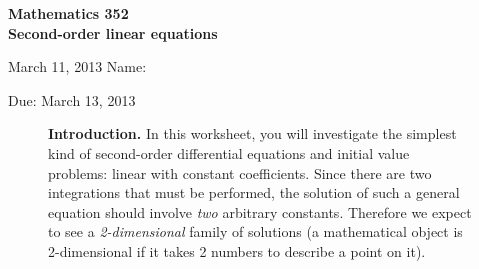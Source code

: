 \documentclass[11pt]{exam}
\begin{document}
\noindent
\textbf{{\large Mathematics 352 \\ Second-order linear equations}}

\noindent
March 11, 2013 \hfill Name: \underline{\hspace{3in}} 

\noindent
Due: March 13, 2013

\noindent
\begin{figure}[h]
\centering
\begin{minipage}[b]{0.85\linewidth}
\textbf{Introduction.} In this worksheet, you will investigate the simplest kind of second-order differential equations and initial value problems: linear with constant coefficients. Since there are two integrations that must be performed, the solution of such a general equation should involve \emph{two} arbitrary constants. Therefore we expect to see a \emph{2-dimensional} family of solutions (a mathematical object is 2-dimensional if it takes 2 numbers to describe a point on it).
\end{minipage}
\end{figure}
\end{document}
